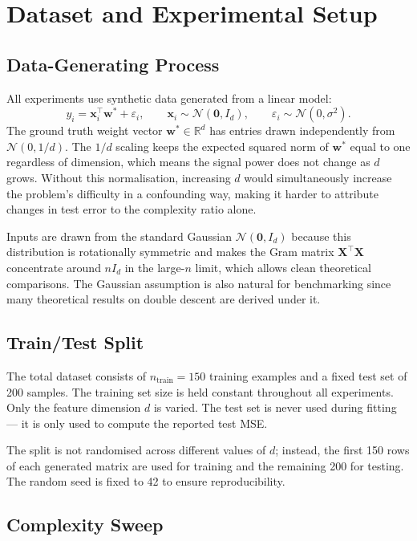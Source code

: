 \documentclass[11pt,a4paper]{article}
\begin{document}
\section{Dataset and Experimental Setup}

\subsection{Data-Generating Process}

All experiments use synthetic data generated from a linear model:
\[
    y_i = \mathbf{x}_i^\top \mathbf{w}^* + \varepsilon_i,
    \qquad
    \mathbf{x}_i \sim \mathcal{N}(\mathbf{0}, I_d),
    \qquad
    \varepsilon_i \sim \mathcal{N}(0, \sigma^2).
\]
The ground truth weight vector $\mathbf{w}^* \in \mathbb{R}^d$ has entries drawn independently from $\mathcal{N}(0, 1/d)$. The $1/d$ scaling keeps the expected squared norm of $\mathbf{w}^*$ equal to one regardless of dimension, which means the signal power does not change as $d$ grows. Without this normalisation, increasing $d$ would simultaneously increase the problem's difficulty in a confounding way, making it harder to attribute changes in test error to the complexity ratio alone.

Inputs are drawn from the standard Gaussian $\mathcal{N}(\mathbf{0}, I_d)$ because this distribution is rotationally symmetric and makes the Gram matrix $\mathbf{X}^\top \mathbf{X}$ concentrate around $n I_d$ in the large-$n$ limit, which allows clean theoretical comparisons. The Gaussian assumption is also natural for benchmarking since many theoretical results on double descent are derived under it.

\subsection{Train/Test Split}

The total dataset consists of $n_{\text{train}} = 150$ training examples and a fixed test set of 200 samples. The training set size is held constant throughout all experiments. Only the feature dimension $d$ is varied. The test set is never used during fitting --- it is only used to compute the reported test MSE.

The split is not randomised across different values of $d$; instead, the first 150 rows of each generated matrix are used for training and the remaining 200 for testing. The random seed is fixed to 42 to ensure reproducibility.

\subsection{Complexity Sweep}
\end{document}
